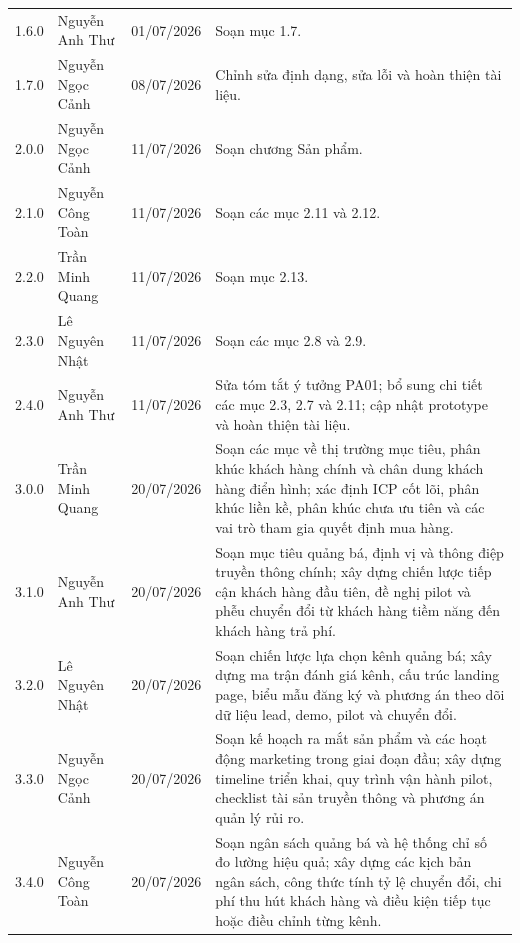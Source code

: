\documentclass[12pt,a4paper]{article}
\begin{document}
\begin{longtable}{@{}L{1.8cm}L{3.0cm}L{2.3cm}L{8.8cm}@{}}
1.6.0 &
Nguyễn Anh Thư &
01/07/2026 &
Soạn mục 1.7. \\

1.7.0 &
Nguyễn Ngọc Cảnh &
08/07/2026 &
Chỉnh sửa định dạng, sửa lỗi và hoàn thiện tài liệu. \\

2.0.0 &
Nguyễn Ngọc Cảnh &
11/07/2026 &
Soạn chương Sản phẩm. \\

2.1.0 &
Nguyễn Công Toàn &
11/07/2026 &
Soạn các mục 2.11 và 2.12. \\

2.2.0 &
Trần Minh Quang &
11/07/2026 &
Soạn mục 2.13. \\

2.3.0 &
Lê Nguyên Nhật &
11/07/2026 &
Soạn các mục 2.8 và 2.9. \\

2.4.0 &
Nguyễn Anh Thư &
11/07/2026 &
Sửa tóm tắt ý tưởng PA01; bổ sung chi tiết các mục 2.3, 2.7 và 2.11; cập nhật prototype và hoàn thiện tài liệu. \\

3.0.0 &
Trần Minh Quang &
20/07/2026 &
Soạn các mục về thị trường mục tiêu, phân khúc khách hàng chính và chân dung khách hàng điển hình; xác định ICP cốt lõi, phân khúc liền kề, phân khúc chưa ưu tiên và các vai trò tham gia quyết định mua hàng. \\

3.1.0 &
Nguyễn Anh Thư &
20/07/2026 &
Soạn mục tiêu quảng bá, định vị và thông điệp truyền thông chính; xây dựng chiến lược tiếp cận khách hàng đầu tiên, đề nghị pilot và phễu chuyển đổi từ khách hàng tiềm năng đến khách hàng trả phí. \\

3.2.0 &
Lê Nguyên Nhật &
20/07/2026 &
Soạn chiến lược lựa chọn kênh quảng bá; xây dựng ma trận đánh giá kênh, cấu trúc landing page, biểu mẫu đăng ký và phương án theo dõi dữ liệu lead, demo, pilot và chuyển đổi. \\

3.3.0 &
Nguyễn Ngọc Cảnh &
20/07/2026 &
Soạn kế hoạch ra mắt sản phẩm và các hoạt động marketing trong giai đoạn đầu; xây dựng timeline triển khai, quy trình vận hành pilot, checklist tài sản truyền thông và phương án quản lý rủi ro. \\

3.4.0 &
Nguyễn Công Toàn &
20/07/2026 &
Soạn ngân sách quảng bá và hệ thống chỉ số đo lường hiệu quả; xây dựng các kịch bản ngân sách, công thức tính tỷ lệ chuyển đổi, chi phí thu hút khách hàng và điều kiện tiếp tục hoặc điều chỉnh từng kênh. \\


\end{longtable}
\end{document}
